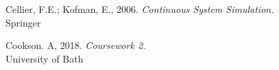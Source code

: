 \documentclass[11pt]{article}
\begin{document}
\begin{thebibliography}{9}
%

Cellier, F.E.; Kofman, E., 2006. 
\textit{Continuous System Simulation.}\\
Springer

Cookson. A, 2018. 
\textit{Coursework 2.}\\
University of Bath
\end{thebibliography}

\end{document}
